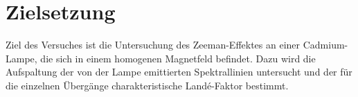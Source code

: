 \section{Zielsetzung}
\label{sec:zielsetzung}
%
Ziel des Versuches ist die Untersuchung des Zeeman-Effektes an einer Cadmium-Lampe, die sich in einem homogenen Magnetfeld befindet.
Dazu wird die Aufspaltung der von der Lampe emittierten Spektrallinien untersucht und der für die einzelnen Übergänge charakteristische Landé-Faktor bestimmt.